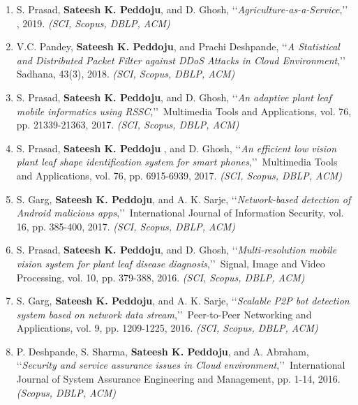 \begin{enumerate}[label=(J\arabic*)]
	\item
	S. Prasad, \textbf{Sateesh K. Peddoju}, and D. Ghosh, \lq\lq \textit{Agriculture-as-a-Service},\rq\rq\, {\color{magenta}{IEEE Potentials, in Press }}, 2019. \emph{(SCI, Scopus, DBLP, ACM)}
	
	\item
	V.C. Pandey, \textbf{Sateesh K. Peddoju}, and Prachi Deshpande, \lq\lq \textit{A Statistical and Distributed Packet Filter against DDoS Attacks in Cloud Environment},\rq\rq\, Sadhana, 43(3), 2018. \emph{(SCI, Scopus, DBLP, ACM)}
	
	\item
	S. Prasad, \textbf{Sateesh K. Peddoju}, and D. Ghosh, \lq\lq \textit{An adaptive plant leaf mobile informatics using RSSC},\rq\rq\, Multimedia Tools and Applications, vol. 76, pp. 21339-21363, 2017. \emph{(SCI, Scopus, DBLP, ACM)}
	
	\item
	S. Prasad, \textbf{Sateesh K. Peddoju} , and D. Ghosh, \lq\lq \textit{An efficient low vision plant leaf shape identification system for smart phones},\rq\rq\, Multimedia Tools and Applications, vol. 76, pp. 6915-6939, 2017. \emph{(SCI, Scopus, DBLP, ACM)}
	
	\item
	S. Garg, \textbf{Sateesh K. Peddoju}, and A. K. Sarje, \lq\lq \textit{Network-based detection of Android malicious apps},\rq\rq\, International Journal of Information Security, vol. 16, pp. 385-400, 2017. \emph{(SCI, Scopus, DBLP, ACM)}
	
	\item
	S. Prasad, \textbf{Sateesh K. Peddoju}, and D. Ghosh, \lq\lq \textit{Multi-resolution mobile vision system for plant leaf disease diagnosis},\rq\rq\, Signal, Image and Video Processing, vol. 10, pp. 379-388, 2016. \emph{(SCI, Scopus, DBLP, ACM)}
	
	\item
	S. Garg, \textbf{Sateesh K. Peddoju}, and A. K. Sarje, \lq\lq \textit{Scalable P2P bot detection system based on network data stream},\rq\rq\, Peer-to-Peer Networking and Applications, vol. 9, pp. 1209-1225, 2016. \emph{(SCI, Scopus, DBLP, ACM)}
	
	\item
	P. Deshpande, S. Sharma, \textbf{Sateesh K. Peddoju}, and A. Abraham, \lq\lq \textit{Security and service assurance issues in Cloud environment},\rq\rq\, International Journal of System Assurance Engineering and Management, pp. 1-14, 2016. \emph{(Scopus, DBLP, ACM)}
	

\end{enumerate}
